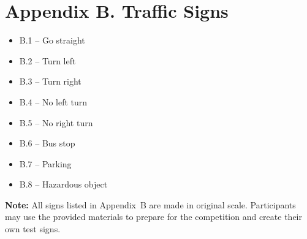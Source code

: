 \documentclass[a4paper,12pt]{article}
\begin{document}
\section*{Appendix B. Traffic Signs}

\begin{itemize}
\item B.1 -- Go straight
\item B.2 -- Turn left
\item B.3 -- Turn right
\item B.4 -- No left turn
\item B.5 -- No right turn
\item B.6 -- Bus stop
\item B.7 -- Parking
\item B.8 -- Hazardous object
\end{itemize}

\textbf{Note:} All signs listed in Appendix~B are made in original scale. Participants may use the provided materials to prepare for the competition and create their own test signs.
\end{document}
